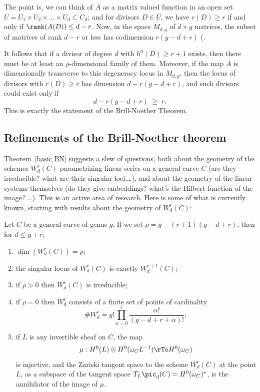 The point is, we can think of $A$ as a matrix valued function in an open set $U = U_1 \times U_2 \times \dots \times U_d \subset C_d$; and for divisors $D \in U$, we have $r(D) \geq r$ if and only if $\rank(A(D)) \leq d-r$. Now, in the space $M_{d,g}$ of $d \times g$ matrices, the subset of matrices of rank $d-r$ or less has codimension $r(g-d+r)$ (\cite[Theorem ****]{Eisenbud1995}. 

It follows 
that if  a divisor of degree $d$ with $h^0(D) \geq r+1$ exists, then there must be at least an $\rho$-dimensional family of them. Moreover, if the map $A$ is dimensionally transverse to this degeneracy locus in $M_{d,g}$, then the locus of divisors with $r(D) \geq r$ has dimension $d - r(g-d+r)$, and such divisors could exist only if
$$
d - r(g-d+r) \; \geq \; r.
$$
This is exactly the statement of the Brill-Noether Theorem.


\subsection{Refinements of the Brill-Noether theorem}

Theorem~\ref{basic BN} suggests a slew of questions, both about the geometry of the schemes $W^r_d(C)$ parametrizing linear series on a general curve $C$ (are they irreducible? what are their singular loci,\dots), and about the geometry of the linear systems themselves (do they give embeddings? what's the Hilbert function of the image? \dots). This is an active area of research. Here is some of what is currently known, starting with results about the geometry of $W^r_d(C)$:

\begin{theorem}\label{Wrd omnibus}
Let $C$ be a general curve of genus $g$. If we set $\rho = g - (r+1)(g-d+r)$, then for $d \leq g+r$,
\begin{enumerate}
\item $\dim(W^r_d(C)) = \rho$;
\item\label{sing wrd} the singular locus of $W^r_d(C)$ is exactly $W^{r+1}_d(C)$;
\item\label{irr wrd} if $\rho > 0$ then $W^r_d(C)$ is irreducible;
\item\label{rho=0} if $\rho = 0$ then $W^r_d$ consists of a finite set of  points of cardinality
$$
\#W^r_d = g! \prod_{\alpha=0}^r \frac{\alpha!}{(g-d+r+\alpha)!};
$$
\item\label{Petri} if $L$ is any invertible sheaf on $C$, the map
$$
\mu : H^0(L) \otimes H^0(\omega_CL^{-1}) \rTo H^0(\omega_C)
$$
is injective, and the Zariski tangent space to the scheme $W^r_d(C)$ at the point $L$, as a subspace
of the tangent space $T_L\pic_d(C) = H^0(\omega_C)^*$, is the annihilator of the image of $\mu$.
\end{enumerate}
\end{theorem}

